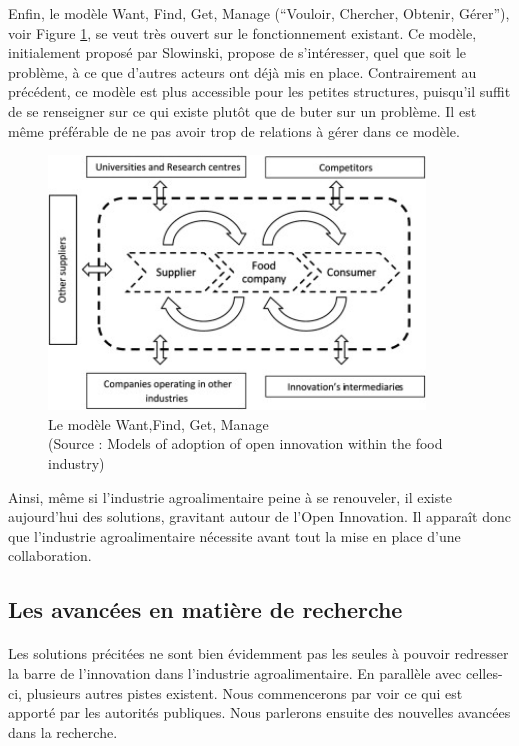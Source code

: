 \documentclass[a4paper,12pt]{report}
\begin{document}
			Enfin, le modèle Want, Find, Get, Manage (“Vouloir, Chercher, Obtenir, Gérer”), voir Figure \ref{ImageWFGM}, se veut très ouvert sur le fonctionnement existant. Ce modèle, initialement proposé par Slowinski\cite{WFGM}, propose de s’intéresser, quel que soit le problème, à ce que d’autres acteurs ont déjà mis en place. Contrairement au précédent, ce modèle est plus accessible pour les petites structures, puisqu’il suffit de se renseigner sur ce qui existe plutôt que de buter sur un problème. Il est même préférable de ne pas avoir trop de relations à gérer dans ce modèle.

			\begin{figure}[!h]
			\centering
			\includegraphics[width=10cm]{Illustrations/Schema_WFGM.jpg}
			\caption{Le modèle Want,Find, Get, Manage \\(Source : Models of adoption of open innovation within the food industry\cite{OpenInnovation})}
			\label{ImageWFGM}
			\end{figure}
			
			Ainsi, même si l’industrie agroalimentaire peine à se renouveler, il existe aujourd’hui des solutions, gravitant autour de l’Open Innovation. Il apparaît donc que l’industrie agroalimentaire nécessite avant tout la mise en place d’une collaboration.
			
		\subsection{Les avancées en matière de recherche}
		\paragraph{}Les solutions précitées ne sont bien évidemment pas les seules à pouvoir redresser la barre de l’innovation dans l’industrie agroalimentaire. En parallèle avec celles-ci, plusieurs autres pistes existent. Nous commencerons par voir ce qui est apporté par les autorités publiques. Nous parlerons ensuite des nouvelles avancées dans la recherche.
			
\end{document}
